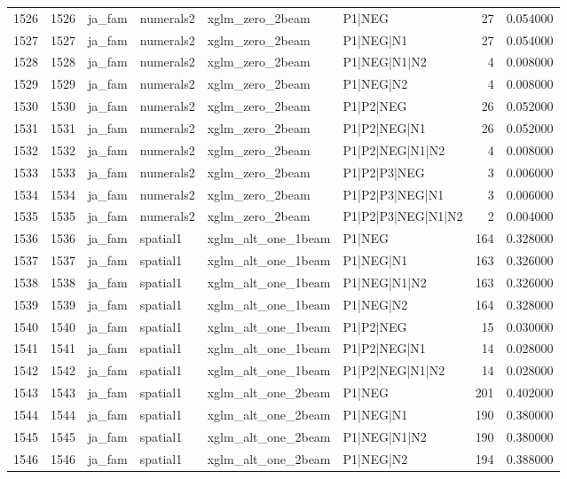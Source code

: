 \begin{tabular}{lrllllrr}
1526 & 1526 & ja_fam & numerals2 & xglm_zero_2beam & P1|NEG & 27 & 0.054000 \\
1527 & 1527 & ja_fam & numerals2 & xglm_zero_2beam & P1|NEG|N1 & 27 & 0.054000 \\
1528 & 1528 & ja_fam & numerals2 & xglm_zero_2beam & P1|NEG|N1|N2 & 4 & 0.008000 \\
1529 & 1529 & ja_fam & numerals2 & xglm_zero_2beam & P1|NEG|N2 & 4 & 0.008000 \\
1530 & 1530 & ja_fam & numerals2 & xglm_zero_2beam & P1|P2|NEG & 26 & 0.052000 \\
1531 & 1531 & ja_fam & numerals2 & xglm_zero_2beam & P1|P2|NEG|N1 & 26 & 0.052000 \\
1532 & 1532 & ja_fam & numerals2 & xglm_zero_2beam & P1|P2|NEG|N1|N2 & 4 & 0.008000 \\
1533 & 1533 & ja_fam & numerals2 & xglm_zero_2beam & P1|P2|P3|NEG & 3 & 0.006000 \\
1534 & 1534 & ja_fam & numerals2 & xglm_zero_2beam & P1|P2|P3|NEG|N1 & 3 & 0.006000 \\
1535 & 1535 & ja_fam & numerals2 & xglm_zero_2beam & P1|P2|P3|NEG|N1|N2 & 2 & 0.004000 \\
1536 & 1536 & ja_fam & spatial1 & xglm_alt_one_1beam & P1|NEG & 164 & 0.328000 \\
1537 & 1537 & ja_fam & spatial1 & xglm_alt_one_1beam & P1|NEG|N1 & 163 & 0.326000 \\
1538 & 1538 & ja_fam & spatial1 & xglm_alt_one_1beam & P1|NEG|N1|N2 & 163 & 0.326000 \\
1539 & 1539 & ja_fam & spatial1 & xglm_alt_one_1beam & P1|NEG|N2 & 164 & 0.328000 \\
1540 & 1540 & ja_fam & spatial1 & xglm_alt_one_1beam & P1|P2|NEG & 15 & 0.030000 \\
1541 & 1541 & ja_fam & spatial1 & xglm_alt_one_1beam & P1|P2|NEG|N1 & 14 & 0.028000 \\
1542 & 1542 & ja_fam & spatial1 & xglm_alt_one_1beam & P1|P2|NEG|N1|N2 & 14 & 0.028000 \\
1543 & 1543 & ja_fam & spatial1 & xglm_alt_one_2beam & P1|NEG & 201 & 0.402000 \\
1544 & 1544 & ja_fam & spatial1 & xglm_alt_one_2beam & P1|NEG|N1 & 190 & 0.380000 \\
1545 & 1545 & ja_fam & spatial1 & xglm_alt_one_2beam & P1|NEG|N1|N2 & 190 & 0.380000 \\
1546 & 1546 & ja_fam & spatial1 & xglm_alt_one_2beam & P1|NEG|N2 & 194 & 0.388000 \\

\end{tabular}
